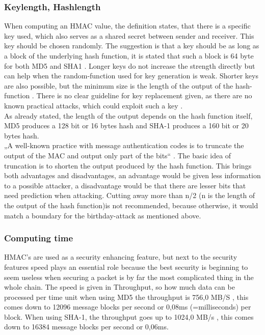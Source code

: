 \subsubsection{Keylength, Hashlength}
When computing an HMAC value, the definition states, that there is a specific key used, which also serves as a shared secret between sender and receiver. This key should be chosen randomly. The suggestion is that a key should be as long as a block of the underlying hash function, it is stated that such a block is 64 byte for both MD5 and SHA1 \cite{RFC}. Longer keys do not increase the strength directly but can help when the random-function used for key generation is weak. Shorter keys are also possible, but the minimum size is the length of the output of the hash-function \cite{RFC}. There is no clear guideline for key replacement given, as there are no known practical attacks, which could exploit such a key \cite{RFC}. \\
As already stated, the length of the output depends on the hash function itself, MD5 produces a 128 bit or 16 bytes hash and SHA-1 produces a 160 bit or 20 bytes hash. \\
„A well-known practice with message authentication codes is to truncate the output of the MAC and output only part of the bits“ \cite{RFC}. The basic idea of truncation is to shorten the output produced by the hash function. This brings both advantages and disadvantages, an advantage would be given less information to a possible attacker, a disadvantage would be that there are lesser bits that need prediction when attacking. Cutting away more than n/2 (n is the length of the output of the hash function)is not recommended, because otherwise, it would match a boundary for the birthday-attack as mentioned above. 
\subsubsection{Computing time}
HMAC’s are used as a security enhancing feature, but next to the security features speed plays an essential role because the best security is beginning to seem useless when securing a packet is by far the most complicated thing in the whole chain. The speed is given in Throughput, so how much data can be processed per time unit when using MD5 the throughput is 756,0 MB/S \cite{MAX}, this comes down to 12096 message blocks per second or 0,08ms (=milliseconds) per block. When using SHA-1, the throughput goes up to 1024,0 MB/s \cite{MAX}, this comes down to 16384 message blocks per second or 0,06ms.



